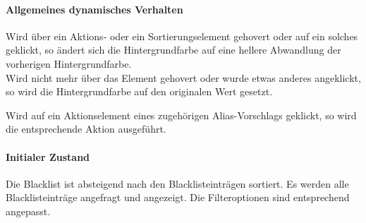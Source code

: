 \paragraph*{Allgemeines dynamisches Verhalten}
Wird über ein Aktions- oder ein Sortierungselement gehovert oder auf ein solches geklickt, so ändert sich die Hintergrundfarbe auf eine hellere Abwandlung der vorherigen Hintergrundfarbe. \\
Wird nicht mehr über das Element gehovert oder wurde etwas anderes angeklickt, so wird die Hintergrundfarbe auf den originalen Wert gesetzt.

Wird auf ein Aktionselement eines zugehörigen Alias-Vorschlags geklickt, so wird die entsprechende Aktion ausgeführt.

\paragraph*{Initialer Zustand}
Die Blacklist ist absteigend nach den Blacklisteinträgen sortiert.
Es werden alle Blacklisteinträge angefragt und angezeigt.
Die Filteroptionen sind entsprechend angepasst.
